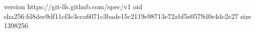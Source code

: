 version https://git-lfs.github.com/spec/v1
oid sha256:fd8dee9df11cf3c3cca6071c3bade15c2119e98713e72abf5e0579d0e4dc2e27
size 1398256
